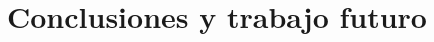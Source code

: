 \documentclass[11pt,lettersize]{article} %
\begin{document}
%

\cleardoublepage
\section{Conclusiones y trabajo futuro}
\label{S-conclusiones}



%
%
\end{document}
